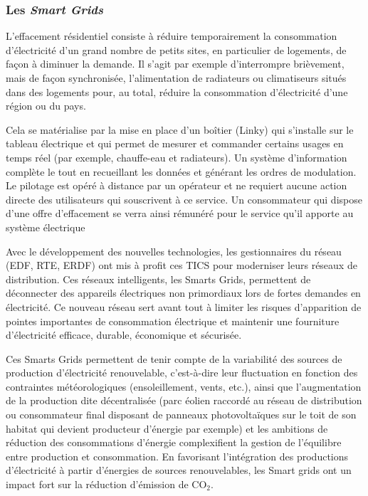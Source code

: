 			
		\subsubsection{Les \emph{Smart Grids}}
		
			L'effacement résidentiel consiste à réduire temporairement la consommation d'électricité d'un grand nombre de petits sites, en particulier de logements, de façon à diminuer la demande. Il s'agit par exemple d'interrompre brièvement, mais de façon synchronisée, l'alimentation de radiateurs ou climatiseurs situés dans des logements pour, au total, réduire la consommation d'électricité d'une région ou du pays.
			
			Cela se matérialise par la mise en place d'un boîtier (Linky) qui s'installe sur le tableau électrique et qui permet de mesurer et commander certains usages en temps réel (par exemple, chauffe-eau et radiateurs). Un système d'information complète le tout en recueillant les données et générant les ordres de modulation. Le pilotage est opéré à distance par un opérateur et ne requiert aucune action directe des utilisateurs qui souscrivent à ce service. Un consommateur qui dispose d'une offre d'effacement se verra ainsi rémunéré pour le service qu'il apporte au système électrique
			
			Avec le développement des nouvelles technologies, les gestionnaires du réseau (EDF, RTE, ERDF) ont mis à profit ces TICS pour moderniser leurs réseaux de distribution. Ces réseaux intelligents, les Smarts Grids, permettent de déconnecter des appareils électriques non primordiaux lors de fortes demandes en électricité. Ce nouveau réseau sert avant tout à limiter les risques d'apparition de pointes importantes de consommation électrique et maintenir une fourniture d'électricité efficace, durable, économique et sécurisée.
			
			Ces Smarts Grids permettent de tenir compte de la variabilité des sources de production d'électricité renouvelable, c'est-à-dire leur fluctuation en fonction des contraintes météorologiques (ensoleillement, vents, etc.), ainsi que l'augmentation de la production dite décentralisée (parc éolien raccordé au réseau de distribution ou consommateur final disposant de panneaux photovoltaïques sur le toit de son habitat qui devient producteur d'énergie par exemple) et les ambitions de réduction des consommations d'énergie complexifient la gestion de l'équilibre entre production et consommation. En favorisant l'intégration des productions d'électricité à partir d'énergies de sources renouvelables, les Smart grids ont un impact fort sur la réduction d'émission de CO$_2$.
			
